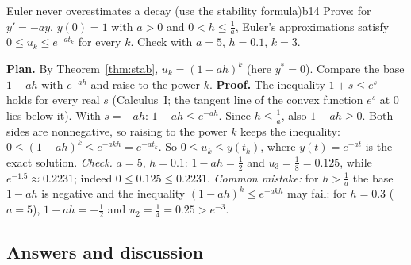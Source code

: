 \documentclass[11pt]{article}
\begin{document}
\begin{exmp}{Euler never overestimates a decay (use the stability formula)}{b14}
Prove: for $y'=-ay$, $y(0)=1$ with $a>0$ and $0<h\le\frac1a$, Euler's approximations satisfy $0\le u_k\le e^{-at_k}$ for every $k$. Check with $a=5$, $h=0.1$, $k=3$.

\textbf{Plan.} By Theorem~\ref{thm:stab}, $u_k=(1-ah)^k$ (here $y^*=0$). Compare the base $1-ah$ with $e^{-ah}$ and raise to the power $k$.
\textbf{Proof.} The inequality $1+s\le e^s$ holds for every real $s$ (Calculus~I; the tangent line of the convex function $e^s$ at $0$ lies below it). With $s=-ah$: $1-ah\le e^{-ah}$. Since $h\le\frac1a$, also $1-ah\ge0$. Both sides are nonnegative, so raising to the power $k$ keeps the inequality: $0\le(1-ah)^k\le e^{-akh}=e^{-at_k}$. So $0\le u_k\le y(t_k)$, where $y(t)=e^{-at}$ is the exact solution.
\emph{Check.} $a=5$, $h=0.1$: $1-ah=\frac12$ and $u_3=\frac18=0.125$, while $e^{-1.5}\approx0.2231$; indeed $0\le0.125\le0.2231$. \emph{Common mistake:} for $h>\frac1a$ the base $1-ah$ is negative and the inequality $(1-ah)^k\le e^{-akh}$ may fail: for $h=0.3$ ($a=5$), $1-ah=-\frac12$ and $u_2=\frac14=0.25>e^{-3}$.
\end{exmp}

\subsection*{Answers and discussion}
\end{document}
